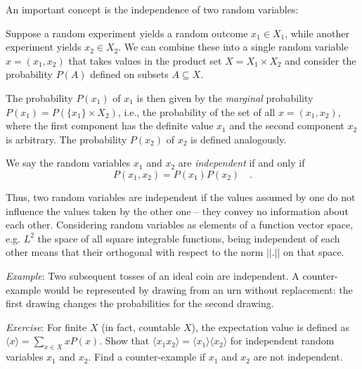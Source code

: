 \documentclass{notebook}
\newcommand{\Example}{\textit{Example}}
\newcommand{\Exercise}{\textit{Exercise}}
\begin{document}
An important concept is the independence of two random variables:

\begin{theorem}
	Suppose a random experiment yields a random outcome $x_1\in X_1$, while another experiment yields $x_2\in X_2$. We can combine these into a single random variable $x=(x_1,x_2)$ that takes values in the product set $X=X_1 \times X_2$ and consider the probability $P(A)$ defined on subsets $A\subseteq X$. 
	
	The probability $P(x_1)$ of $x_1$ is then given by the \textit{marginal} probability $P(x_1)=P(\{x_1\}\times X_2)$, i.e.,  the probability of the set of all $x=(x_1,x_2)$, where the first component has the definite value $x_1$ and the second component $x_2$ is arbitrary. The probability $P(x_2)$ of $x_2$ is defined analogously.  
	
	We say the random variables $x_1$ and $x_2$ are \textit{independent} if and only if
	\begin{equation}
	P(x_1,x_2) = P(x_1)P(x_2) \quad. 
	\end{equation}
\end{theorem}


Thus, two random variables are independent if the values assumed by one do not influence the values taken by the other one – they convey no information about each other. Considering random variables as elements of a function vector space, e.g. $L^2$ the space of all square integrable functions, being independent of each other means that their orthogonal with respect to the norm $||.||$ on that space. 


\Example: 
Two subsequent tosses of an ideal coin are independent.
A counter-example would be represented by drawing from an urn without replacement:
the first drawing changes the probabilities for the second drawing.

\Exercise:
For finite $X$ (in fact, countable $X$), 
the expectation value is defined as
$\langle x\rangle=\sum_{x\in X} x P(x)$.
Show that 
$\langle x_1 x_2 \rangle = \langle x_1 \rangle \langle x_2 \rangle$
for independent random variables $x_1$ and $x_2$.
Find a counter-example if $x_1$ and $x_2$ are not independent.
\end{document}
